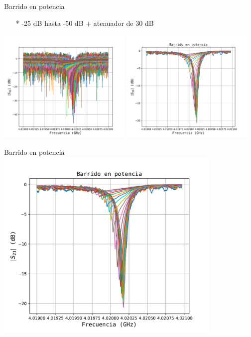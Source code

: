\documentclass[ignorenonframetext,12pt]{beamer}
\begin{document}
\begin{frame}{Barrido en potencia}
				\begin{itemize}
								\item[*] -25 dB hasta -50 dB + atenuador de 30 dB
				\end{itemize}
				\centering
												\includegraphics[width=0.48\textwidth]{resonador0_asc_sin_filtro}
												\includegraphics[width=0.48\textwidth]{resonador0_asc_filtro}
\end{frame}
\begin{frame}{Barrido en potencia}
				\centering
												\includegraphics[width=0.82\textwidth]{resonador0_asc_filtro}
\end{frame}
\end{document}
